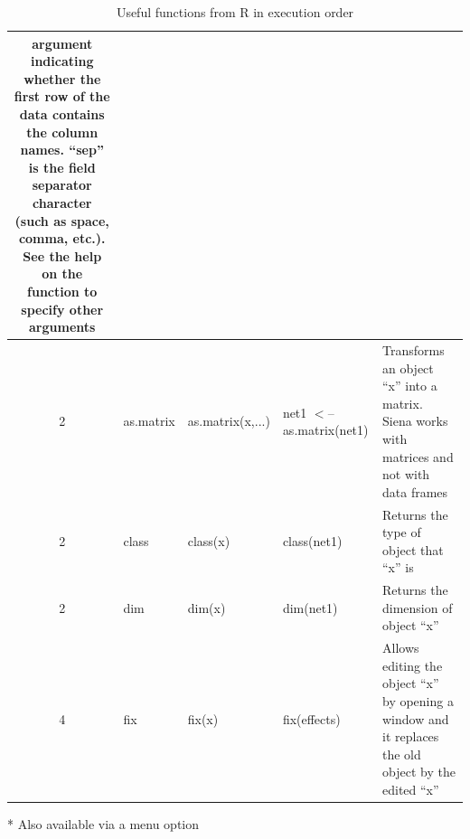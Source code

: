 \documentclass[a4paper,fleqn,11pt]{article}
\newcommand{\+}{\, + \,}
\newcommand{\R}{{\sf R }}
\begin{document}
\begin{table}
\begin{threeparttable}
\begin{small}
\begin{tabular}{c | l | p{3cm} | p{3cm} | p{12cm} }
argument indicating whether the first row of the data contains the column
names. ``sep'' is the field separator character
 (such as space, comma, etc.). See the help on the function to specify
other arguments\\
\hline 2 &  as.matrix   &as.matrix(x,...)   &net1 $<$-- \newline as.matrix(net1) &
Transforms an object ``x'' into a matrix. Siena works with matrices and
not with data frames\\
\hline 2&  class &   class(x)  & class(net1)  & Returns the type of object that
``x'' is\\
\hline
2&   dim  & dim(x)  & dim(net1) &  Returns the dimension of object ``x''\\
\hline 4 &   fix\tnote{*}  & fix(x) &  fix(effects) &  Allows editing the
object ``x''
 by opening a window and it replaces the old object by the edited ``x''\\
\hline
\end{tabular}
\caption[Functions from \R in order of execution] {Useful functions from \R in
execution order} \label{tab:FuncExR}
\begin{tablenotes}
\item [*] Also available via a menu option
\end{tablenotes}
\end{small}
\end{threeparttable}
\end{table}
\end{document}
